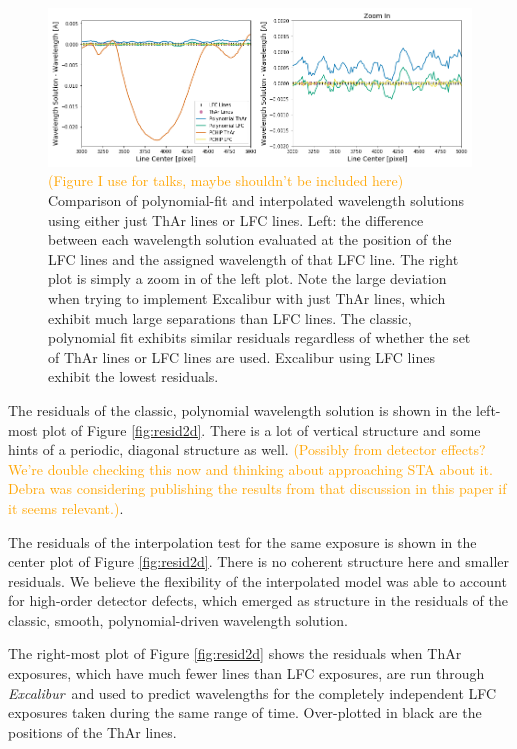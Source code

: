 \documentclass[modern]{aastex63}
\newcommand{\project}[1]{\textsl{#1}}
\newcommand{\name}{\project{Excalibur}}
\newcommand{\lz}[1]{\textcolor{orange}{#1}}
\begin{document}
\begin{figure}[t]
\centering
\includegraphics[width=\textwidth]{Figures/lineDensity.png}
\caption{\lz{(Figure I use for talks, maybe shouldn't be included here)}  Comparison of polynomial-fit and interpolated wavelength solutions using either just ThAr lines or LFC lines. Left: the difference between each wavelength solution evaluated at the position of the LFC lines and the assigned wavelength of that LFC line.  The right plot is simply a zoom in of the left plot.  Note the large deviation when trying to implement Excalibur with just ThAr lines, which exhibit much large separations than LFC lines.  The classic, polynomial  fit exhibits similar residuals regardless of whether the set of ThAr lines or LFC lines are used.  Excalibur using LFC lines exhibit the lowest residuals.}
\label{fig:waveResids}
\end{figure} 

The residuals of the classic, polynomial wavelength solution is shown in the left-most plot of Figure \ref{fig:resid2d}.  There is a lot of vertical structure and some hints of a periodic, diagonal structure as well.  \lz{(Possibly from detector effects?  We're double checking this now and thinking about approaching STA about it.  Debra was considering publishing the results from that discussion in this paper if it seems relevant.)}.

The residuals of the interpolation test for the same exposure is shown in the center plot of Figure \ref{fig:resid2d}.  There is no coherent structure here and smaller residuals.  We believe the flexibility of the interpolated model was able to account for high-order detector defects, which emerged as structure in the residuals of the classic, smooth, polynomial-driven wavelength solution.

The right-most plot of Figure \ref{fig:resid2d} shows the residuals when ThAr exposures, which have much fewer lines than LFC exposures, are run through \name\ and used to predict wavelengths for the completely independent LFC exposures taken during the same range of time.  Over-plotted in black are the positions of the ThAr lines.
\end{document}
